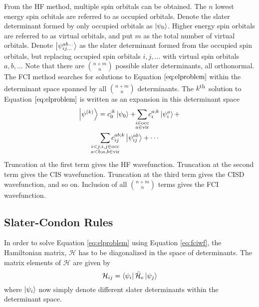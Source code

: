 \documentclass[final,3p,times,twocolumn]{elsarticle}
\newcommand{\ssth}{\textsuperscript{th}}
\newcommand{\ham}{\hat{\mathcal{H}}}
\begin{document}
From the HF method,\cite{roothaan} multiple spin orbitals can be obtained. The $n$ lowest energy spin orbitals are referred to as occupied orbitals. Denote the slater determinant formed by only occupied orbitals as $\ket{\psi_0}$. Higher energy spin orbitals are referred to as virtual orbitals, and put $m$ as the total number of virtual orbitals. Denote $\ket{\psi_{ij\ldots}^{ab\ldots}}$ as the slater determinant formed from the occupied spin orbitals, but replacing occupied spin orbitals $i, j, \ldots$ with virtual spin orbitals $a, b, \ldots$ Note that there are $\binom{n+m}{n}$ possible slater determinants, all orthonormal. The FCI method searches for solutions to Equation $\ref{eq:elproblem}$ within the determinant space spanned by all $\binom{n+m}{n}$ determinants. The $k$\ssth\ solution to Equation $\eqref{eq:elproblem}$ is written as an expansion in this determinant space
\begin{equation}\label{eq:fciwf}
\begin{gathered}
\ket{\psi^{(k)}} = c_0^{;k}\ket{\psi_0} + \sum_{\mathclap{\substack{i\in\text{occ} \\ a \in\text{vir}}}} c_i^{a;k}\ket{\psi_i^a} + \\
\sum_{\mathclap{\substack{i < j; i, j \in\text{occ} \\ a < b; a, b \in\text{vir}}}} c_{ij}^{ab;k}\ket{\psi_{ij}^{ab}} 
+ \cdots
\end{gathered}
\end{equation}
Truncation at the first term gives the HF wavefunction. Truncation at the second term gives the CIS wavefunction. Truncation at the third term gives the CISD wavefunction, and so on. Inclusion of all $\binom{n+m}{n}$ terms gives the FCI wavefunction.

\subsection{Slater-Condon Rules} \label{sec:condonrules}
In order to solve Equation \eqref{eq:elproblem} using Equation \eqref{eq:fciwf}, the Hamiltonian matrix, $\mathcal H$ has to be diagonalized in the space of determinants. The matrix elements of $\mathcal H$ are given by
\begin{equation} \label{eq:hmat}
\mathcal H_{ij} = \bra{\psi_i}\ham_e\ket{\psi_j}
\end{equation}
where $\ket{\psi_i}$ now simply denote different slater determinants within the determinant space.
\end{document}
